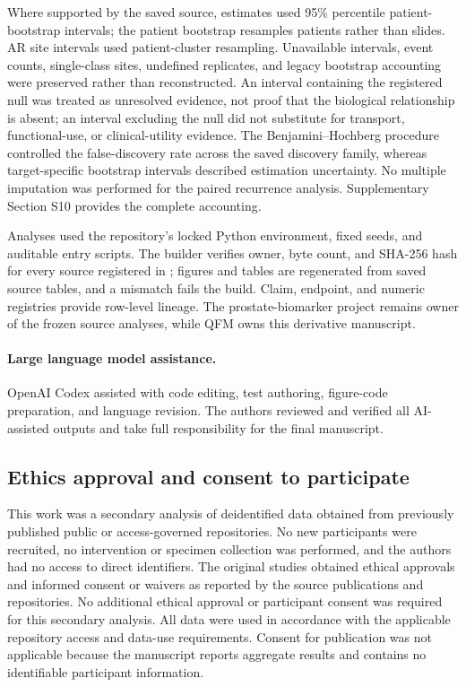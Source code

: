 Where supported by the saved source, estimates used 95\% percentile patient-bootstrap
intervals; the patient bootstrap resamples patients rather than slides. AR site intervals
used patient-cluster resampling. Unavailable intervals, event
counts, single-class sites, undefined replicates, and legacy bootstrap accounting were
preserved rather than reconstructed. An interval containing the registered null was treated
as unresolved evidence, not proof that the biological relationship is absent; an interval excluding the null
did not substitute for transport, functional-use, or clinical-utility evidence. The
Benjamini--Hochberg procedure controlled the false-discovery rate across the saved discovery
family, whereas target-specific bootstrap intervals described estimation uncertainty. No
multiple imputation was performed for the paired recurrence analysis. Supplementary Section
S10 provides the complete accounting.

Analyses used the repository's locked Python environment, fixed seeds, and auditable entry
scripts. The builder verifies owner, byte count, and SHA-256 hash for every source registered
in ; figures and tables are regenerated from
saved source tables, and a mismatch fails the build. Claim, endpoint, and numeric registries
provide row-level lineage. The prostate-biomarker project remains owner of the frozen source
analyses, while QFM owns this derivative manuscript.

\paragraph{Large language model assistance.}
OpenAI Codex assisted with code editing, test authoring, figure-code preparation, and language
revision. The authors reviewed and verified all AI-assisted outputs and take full responsibility
for the final manuscript.

\subsection{Ethics approval and consent to participate}

This work was a secondary analysis of deidentified data obtained from previously published
public or access-governed repositories. No new participants were recruited, no intervention or
specimen collection was performed, and the authors had no access to direct identifiers. The
original studies obtained ethical approvals and informed consent or waivers as reported by the
source publications and repositories. No additional ethical approval or participant consent was
required for this secondary analysis. All data were used in accordance with the applicable
repository access and data-use requirements. Consent for publication was not applicable because
the manuscript reports aggregate results and contains no identifiable participant information.
